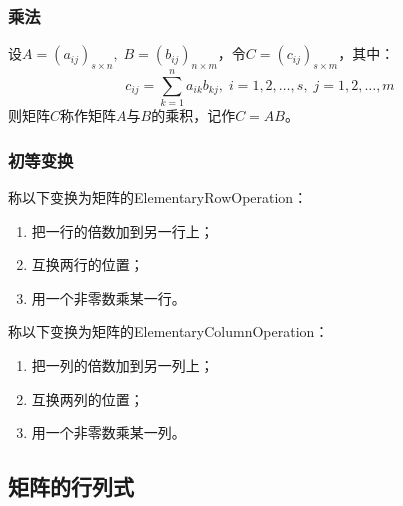 \subsubsection{乘法}
\begin{definition}
	设$A=(a_{ij})_{s\times n},\;B=(b_{ij})_{n\times m}$，令$C=(c_{ij})_{s\times m}$，其中：
	\begin{equation*}
		c_{ij}=\sum_{k=1}^{n}a_{ik}b_{kj},\;i=1,2,\dots,s,\;j=1,2,\dots,m
	\end{equation*}
	则矩阵$C$称作矩阵$A$与$B$的乘积，记作$C=AB$。
\end{definition}
\subsubsection{初等变换}
\begin{definition}
	称以下变换为矩阵的\gls{ElementaryRowOperation}：
	\begin{enumerate}
		\item 把一行的倍数加到另一行上；
		\item 互换两行的位置；
		\item 用一个非零数乘某一行。
	\end{enumerate}
	称以下变换为矩阵的\gls{ElementaryColumnOperation}：
	\begin{enumerate}
		\item 把一列的倍数加到另一列上；
		\item 互换两列的位置；
		\item 用一个非零数乘某一列。
	\end{enumerate}
\end{definition}
\subsection{矩阵的行列式}



